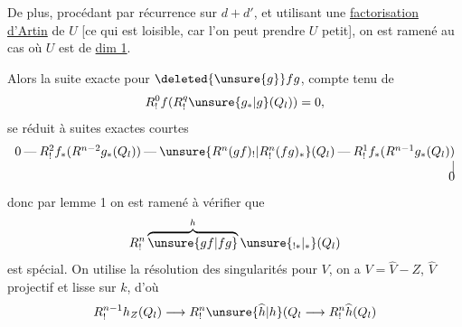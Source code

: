 De plus, procédant par récurrence sur \(d+d'\), et utilisant une
\uline{factorisation d'Artin} de \(U\)
[ce qui est loisible, car l'on peut prendre \(U\) petit],
on est ramené au cas où \(U\) est de \uline{dim 1}.

Alors la suite exacte pour \(\deleted{\unsure{g}}fg\),
compte tenu de
\[
R^0_!f(R^q_!\unsure{g_*|g}(Q_l))=0,
\]
se réduit à  suites exactes courtes
\[
\begin{array}{l}
0\mathbin{\text{---}} R^2_!f_*(R^{n-2}g_*(Q_l))
\mathbin{\text{---}}\unsure{R^n(gf)_!|R^n_!(fg)_*}(Q_l)
\mathbin{\text{---}}R^1_!f_*(R^{n-1}g_*(Q_l))\\
\hfill\mathbin{|}\\[-4pt]
\hfill0
\end{array}
\]
donc par lemme 1 on est ramené à vérifier que
\[
R^n_!\overbrace{\unsure{gf|fg}}^{h}\unsure{_{!*}|_*}(Q_l)
\]
est spécial.
On utilise la résolution des singularités pour \(V\),
on a \(V=\widehat V-Z\), \(\widehat V\) projectif et lisse sur \(k\), d'où
\[
R^{n-1}_!h_Z(Q_l)\longrightarrow
R^n_!\unsure{\widehat h|h}(Q_l\longrightarrow
R^n_!\widehat h(Q_l)
\]
